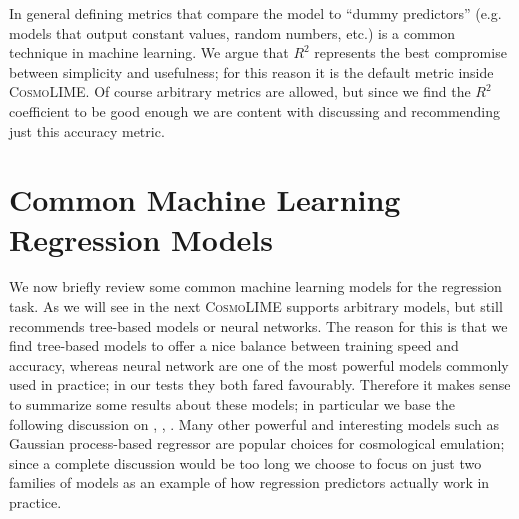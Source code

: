 In general defining metrics that compare the model to ``dummy predictors'' (e.g. models that output constant values, random numbers, etc.) is a common technique in machine learning. We argue that $R^2$ represents the best compromise between simplicity and usefulness; for this reason it is the default metric inside \textsc{CosmoLIME}.
Of course arbitrary metrics are allowed, but since we find the $R^2$ coefficient to be good enough we are content with discussing and recommending just this accuracy metric.



\section{Common Machine Learning Regression Models}\label{sec:ml_models}

We now briefly review some common machine learning models for the regression task. As we will see in the next \textsc{CosmoLIME} supports arbitrary models, but still recommends tree-based models or neural networks. The reason for this is that we find tree-based models to offer a nice balance between training speed and accuracy, whereas neural network are one of the most powerful models commonly used in practice; in our tests they both fared favourably.
Therefore it makes sense to summarize some results about these models; in particular we base the following discussion on \cite{islp}, \cite{understanding_ml}, \cite{ml_probabilistic_perspective}.
Many other powerful and interesting models such as Gaussian process-based regressor are popular choices for cosmological emulation; since a complete discussion would be too long we choose to focus on just two families of models as an example of how regression predictors actually work in practice.

